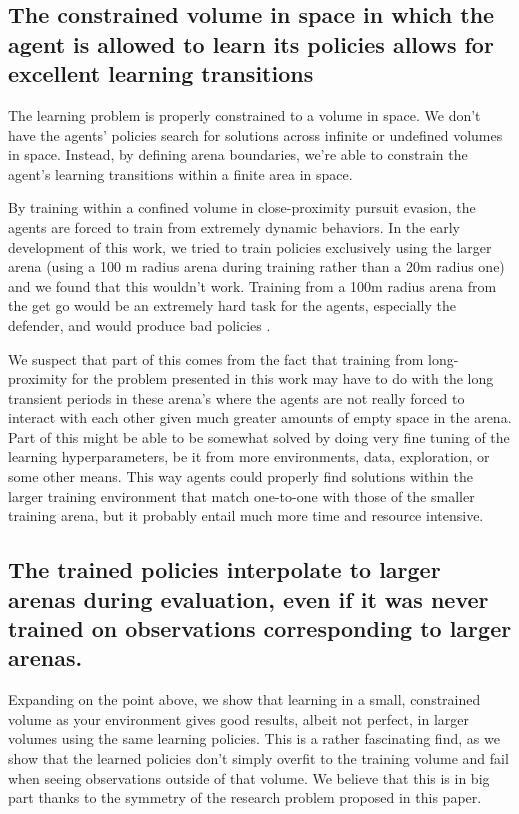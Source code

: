 \subsection*{The constrained volume in space in which the agent is allowed to learn its policies allows for excellent learning transitions}


The learning problem is properly constrained to a volume in space. We don't have the agents' policies search for solutions across infinite or undefined volumes in space. Instead, by defining arena boundaries, we're able to constrain the agent's learning transitions within a finite area in space.

By training within a confined volume in close-proximity pursuit evasion, the agents are forced to train from extremely dynamic behaviors. In the early development of this work, we tried to train policies exclusively using the larger arena (using a 100 m radius arena during training rather than a 20m radius one) and we found that this wouldn't work. Training from a 100m radius arena from the get go would be an extremely hard task for the agents, especially the defender, and would produce bad policies .

We suspect that part of this comes from the fact that training from long-proximity for the problem presented in this work may have to do with the long transient periods in these arena's where the agents are not really forced to interact with each other given much greater amounts of empty space in the arena. Part of this might be able to be somewhat solved by doing very fine tuning of the learning hyperparameters, be it from more environments, data, exploration, or some other means. This way agents could properly find solutions within the larger training environment that match one-to-one with those of the smaller training arena, but it probably entail much more time and resource intensive.



\subsection*{The trained policies  interpolate to larger arenas during evaluation, even if it was never trained on observations corresponding to larger arenas.}


Expanding on the point above, we show that learning in a small, constrained volume as your environment gives good results, albeit not perfect, in larger volumes using the same learning policies. This is a rather fascinating find, as we show that the learned policies don't simply overfit to the training volume and fail when seeing observations outside of that volume. We believe that this is in big part thanks to the symmetry of the research problem proposed in this paper.

